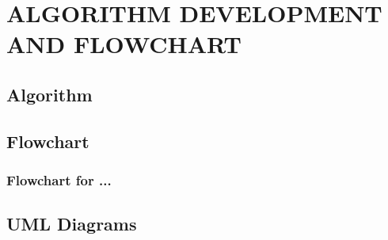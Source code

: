 \documentclass[main]{subfiles}
\begin{document}
\chapter{ALGORITHM DEVELOPMENT AND FLOWCHART}

\section{Algorithm}
	

\section{Flowchart}
    \subsection{Flowchart for ...}


\section{UML Diagrams}
\end{document}
